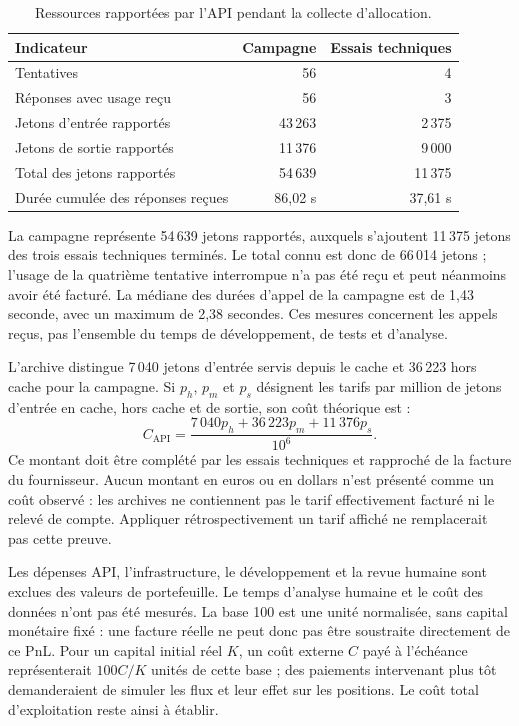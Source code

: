 \begin{table}[H]
\centering
\caption{Ressources rapportées par l'API pendant la collecte d'allocation.}
\label{tab:allocation-api}
\small
\begin{tabular}{p{}rr}
\toprule
\textbf{Indicateur} & \textbf{Campagne} & \textbf{Essais techniques} \\
\midrule
Tentatives & 56 & 4 \\
Réponses avec usage reçu & 56 & 3 \\
Jetons d'entrée rapportés & 43\,263 & 2\,375 \\
Jetons de sortie rapportés & 11\,376 & 9\,000 \\
Total des jetons rapportés & 54\,639 & 11\,375 \\
Durée cumulée des réponses reçues & 86,02 s & 37,61 s \\
\bottomrule
\end{tabular}
\end{table}

La campagne représente 54\,639 jetons rapportés, auxquels s'ajoutent 11\,375 jetons des trois essais techniques terminés. Le total connu est donc de 66\,014 jetons ; l'usage de la quatrième tentative interrompue n'a pas été reçu et peut néanmoins avoir été facturé. La médiane des durées d'appel de la campagne est de 1,43 seconde, avec un maximum de 2,38 secondes. Ces mesures concernent les appels reçus, pas l'ensemble du temps de développement, de tests et d'analyse.

L'archive distingue 7\,040 jetons d'entrée servis depuis le cache et 36\,223 hors cache pour la campagne. Si $p_h$, $p_m$ et $p_s$ désignent les tarifs par million de jetons d'entrée en cache, hors cache et de sortie, son coût théorique est :
\[
C_{\mathrm{API}}=\frac{7\,040p_h+36\,223p_m+11\,376p_s}{10^6}.
\]
Ce montant doit être complété par les essais techniques et rapproché de la facture du fournisseur. Aucun montant en euros ou en dollars n'est présenté comme un coût observé : les archives ne contiennent pas le tarif effectivement facturé ni le relevé de compte. Appliquer rétrospectivement un tarif affiché ne remplacerait pas cette preuve.

Les dépenses API, l'infrastructure, le développement et la revue humaine sont exclues des valeurs de portefeuille. Le temps d'analyse humaine et le coût des données n'ont pas été mesurés. La base 100 est une unité normalisée, sans capital monétaire fixé : une facture réelle ne peut donc pas être soustraite directement de ce PnL. Pour un capital initial réel $K$, un coût externe $C$ payé à l'échéance représenterait $100C/K$ unités de cette base ; des paiements intervenant plus tôt demanderaient de simuler les flux et leur effet sur les positions. Le coût total d'exploitation reste ainsi à établir.

